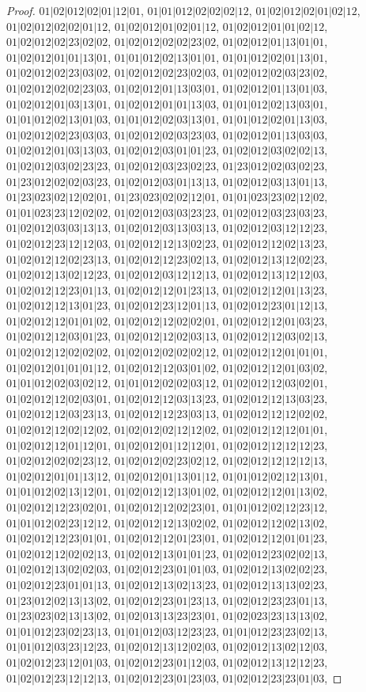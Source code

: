 \documentclass[12pt]{article}
\theoremstyle{plain}
\theoremstyle{definition}
\theoremstyle{remark}
\begin{document}
\begin{proof}
$01|02|012|02|01|12|01$, $01|01|012|02|02|02|12$, $01|02|012|02|01|02|12$, $01|02|012|02|02|01|12$, $01|02|012|01|02|01|12$, $01|02|012|01|01|02|12$, $01|02|012|02|23|02|02$, $01|02|012|02|02|23|02$, $01|02|012|01|13|01|01$, $01|02|012|01|01|13|01$, $01|01|012|02|13|01|01$, $01|01|012|02|01|13|01$, $01|02|012|02|23|03|02$, $01|02|012|02|23|02|03$, $01|02|012|02|03|23|02$, $01|02|012|02|02|23|03$, $01|02|012|01|13|03|01$, $01|02|012|01|13|01|03$, $01|02|012|01|03|13|01$, $01|02|012|01|01|13|03$, $01|01|012|02|13|03|01$, $01|01|012|02|13|01|03$, $01|01|012|02|03|13|01$, $01|01|012|02|01|13|03$, $01|02|012|02|23|03|03$, $01|02|012|02|03|23|03$, $01|02|012|01|13|03|03$, $01|02|012|01|03|13|03$, $01|02|012|03|01|01|23$, $01|02|012|03|02|02|13$, $01|02|012|03|02|23|23$, $01|02|012|03|23|02|23$, $01|23|012|02|03|02|23$, $01|23|012|02|02|03|23$, $01|02|012|03|01|13|13$, $01|02|012|03|13|01|13$, $01|23|023|02|12|02|01$, $01|23|023|02|02|12|01$, $01|01|023|23|02|12|02$, $01|01|023|23|12|02|02$, $01|02|012|03|03|23|23$, $01|02|012|03|23|03|23$, $01|02|012|03|03|13|13$, $01|02|012|03|13|03|13$, $01|02|012|03|12|12|23$, $01|02|012|23|12|12|03$, $01|02|012|12|13|02|23$, $01|02|012|12|02|13|23$, $01|02|012|12|02|23|13$, $01|02|012|12|23|02|13$, $01|02|012|13|12|02|23$, $01|02|012|13|02|12|23$, $01|02|012|03|12|12|13$, $01|02|012|13|12|12|03$, $01|02|012|12|23|01|13$, $01|02|012|12|01|23|13$, $01|02|012|12|01|13|23$, $01|02|012|12|13|01|23$, $01|02|012|23|12|01|13$, $01|02|012|23|01|12|13$, $01|02|012|12|01|01|02$, $01|02|012|12|02|02|01$, $01|02|012|12|01|03|23$, $01|02|012|12|03|01|23$, $01|02|012|12|02|03|13$, $01|02|012|12|03|02|13$, $01|02|012|12|02|02|02$, $01|02|012|02|02|02|12$, $01|02|012|12|01|01|01$, $01|02|012|01|01|01|12$, $01|02|012|12|03|01|02$, $01|02|012|12|01|03|02$, $01|01|012|02|03|02|12$, $01|01|012|02|02|03|12$, $01|02|012|12|03|02|01$, $01|02|012|12|02|03|01$, $01|02|012|12|03|13|23$, $01|02|012|12|13|03|23$, $01|02|012|12|03|23|13$, $01|02|012|12|23|03|13$, $01|02|012|12|12|02|02$, $01|02|012|12|02|12|02$, $01|02|012|02|12|12|02$, $01|02|012|12|12|01|01$, $01|02|012|12|01|12|01$, $01|02|012|01|12|12|01$, $01|02|012|12|12|12|23$, $01|02|012|02|02|23|12$, $01|02|012|02|23|02|12$, $01|02|012|12|12|12|13$, $01|02|012|01|01|13|12$, $01|02|012|01|13|01|12$, $01|01|012|02|12|13|01$, $01|01|012|02|13|12|01$, $01|02|012|12|13|01|02$, $01|02|012|12|01|13|02$, $01|02|012|12|23|02|01$, $01|02|012|12|02|23|01$, $01|01|012|02|12|23|12$, $01|01|012|02|23|12|12$, $01|02|012|12|13|02|02$, $01|02|012|12|02|13|02$, $01|02|012|12|23|01|01$, $01|02|012|12|01|23|01$, $01|02|012|12|01|01|23$, $01|02|012|12|02|02|13$, $01|02|012|13|01|01|23$, $01|02|012|23|02|02|13$, $01|02|012|13|02|02|03$, $01|02|012|23|01|01|03$, $01|02|012|13|02|02|23$, $01|02|012|23|01|01|13$, $01|02|012|13|02|13|23$, $01|02|012|13|13|02|23$, $01|23|012|02|13|13|02$, $01|02|012|23|01|23|13$, $01|02|012|23|23|01|13$, $01|23|023|02|13|13|02$, $01|02|013|13|23|23|01$, $01|02|023|23|13|13|02$, $01|01|012|23|02|23|13$, $01|01|012|03|12|23|23$, $01|01|012|23|23|02|13$, $01|01|012|03|23|12|23$, $01|02|012|13|12|02|03$, $01|02|012|13|02|12|03$, $01|02|012|23|12|01|03$, $01|02|012|23|01|12|03$, $01|02|012|13|12|12|23$, $01|02|012|23|12|12|13$, $01|02|012|23|01|23|03$, $01|02|012|23|23|01|03$, 
\end{proof}
\end{document}
